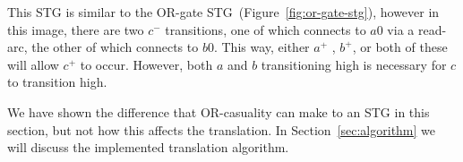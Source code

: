 \documentclass[british,conference,compsoc]{IEEEtran}
\begin{document}
This STG is similar to the OR-gate STG~(Figure~\ref{fig:or-gate-stg}), however
in this image, there are two $c^{-}$ transitions, one of which connects to $a0$
via a read-arc, the other of which connects to $b0$. This way, either $a^{+}$ 
, $b^{+}$, or both of these will allow $c^{+}$ to occur. However, both $a$ and
$b$ transitioning high is necessary for $c$ to transition high. 

We have shown the difference that OR-casuality can make to an STG in this
section, but not how this affects the translation. In Section~\ref{sec:algorithm} we 
will discuss the implemented translation algorithm. 

%
%
%
%
\end{document}
